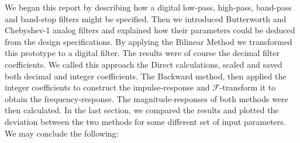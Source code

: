 \documentclass{sebase}
\begin{document}
We began this report by describing how a digital low-pass, high-pass,
band-pass and band-stop filters might be specified. Then we introduced
Butterworth and Chebyshev-1 analog filters and explained how their
parameters could be deduced from the design specifications. By applying the
Bilinear Method we transformed this prototype to a digital filter. The
results were of course the decimal filter coefficients. We called this
approach the Direct calculations, scaled and saved both decimal and integer
coefficients. The Backward method, then applied the integer coefficients to
construct the impulse-response and $\mathcal{F}$-transform it to obtain the
frequency-response. The magnitude-responses of both methods were then
calculated. In the last section, we compared the results and plotted the
deviation between the two methods for some different set of input
parameters. We may conclude the following:
\end{document}
